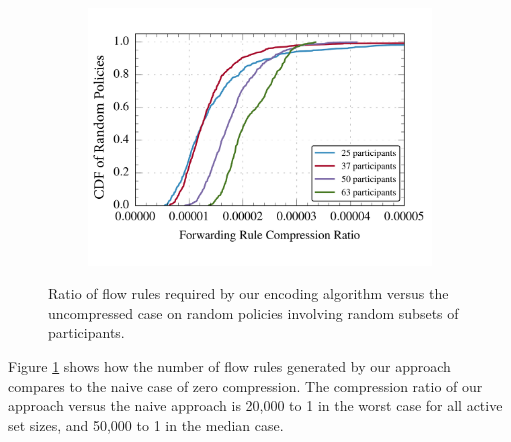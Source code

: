 \begin{figure}[t!] 
\begin{minipage}{1\linewidth}
\begin{subfigure}[b]{0.96\linewidth}
\includegraphics[width=\linewidth]{figures/compression_cdf}
\end{subfigure} 
\end{minipage} 
\caption{Ratio of flow rules required by our encoding algorithm versus the uncompressed
case on random policies involving random subsets of participants.}
\label{fig:compression}
\end{figure}

Figure \ref{fig:compression} shows how the number of flow rules generated by our approach compares to the naive case of zero compression. The compression ratio of our approach versus the naive approach is 20,000 to 1 in the worst case for all active set sizes, and 50,000 to 1 in the median case.



